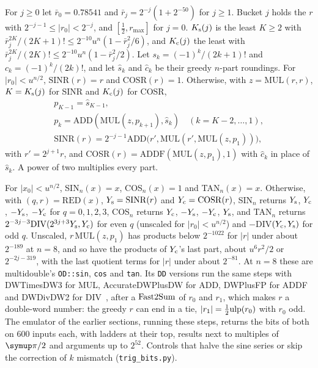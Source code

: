 For $j \ge 0$ let $\bar r_0 = 0.78541$ and $\bar r_j = 2^{-j}(1 + 2^{-50})$ for $j \ge 1$. Bucket $j$ holds
the $r$ with $2^{-j-1} \le |r_0| < 2^{-j}$, and $[\frac12, r_{\max}]$ for $j = 0$. $K_{\rm s}(j)$ is the least $K \ge 2$
with $\bar r_j^{2K}/(2K+1)! \le 2^{-10}u^n(1 - \bar r_j^2/6)$, and $K_{\rm c}(j)$ the least with $\bar r_j^{2K}/(2K)! \le
2^{-10}u^n(1 - \bar r_j^2/2)$. Let $s_k = (-1)^k/(2k+1)!$ and $c_k = (-1)^k/(2k)!$, and let $\hat s_k$ and $\hat c_k$ be
their greedy $n$-part roundings. For $|r_0| < u^{n/2}$, $\textrm{SINR}(r) = r$ and $\textrm{COSR}(r) = 1$. Otherwise,
with $z = \mathrm{MUL}(r, r)$, $K = K_{\rm s}(j)$ for SINR and $K_{\rm c}(j)$ for COSR,
\begin{gather*}
p_{K-1} = \hat s_{K-1}, \\
p_k = \mathrm{ADD}(\mathrm{MUL}(z, p_{k+1}), \hat s_k) \quad (k = K-2, \dots, 1), \\
\textrm{SINR}(r) = 2^{-j-1}\mathrm{ADD}\bigl(r', \mathrm{MUL}(r', \mathrm{MUL}(z, p_1))\bigr),
\end{gather*}
with $r' = 2^{j+1}r$, and COSR$(r) = \mathrm{ADDF}(\mathrm{MUL}(z,
p_1), 1)$ with $\hat c_k$ in place of $\hat s_k$. A power of two multiplies every part.

 For $|x_0| < u^{n/2}$, SIN$_n(x) = x$, COS$_n(x) = 1$ and TAN$_n(x) = x$. Otherwise, with $(q, r)
= \mathrm{RED}(x)$, $Y_{\rm s} = \mathrm{SINR}(r)$ and $Y_{\rm c} = \mathrm{COSR}(r)$, SIN$_n$ returns $Y_{\rm s}$,
$Y_{\rm c}$, $-Y_{\rm s}$, $-Y_{\rm c}$ for $q = 0, 1, 2, 3$, COS$_n$ returns $Y_{\rm c}$, $-Y_{\rm s}$, $-Y_{\rm c}$,
$Y_{\rm s}$, and TAN$_n$ returns $2^{-3j-3}\mathrm{DIV}(2^{3j+3}Y_{\rm s}, Y_{\rm c})$ for even $q$ (unscaled for
$|r_0| < u^{n/2}$) and $-$DIV$(Y_{\rm c}, Y_{\rm s})$ for odd $q$. Unscaled, $r\,\mathrm{MUL}(z, p_1)$ has products below
$2^{-1022}$ for $|r|$ under about $2^{-189}$ at $n = 8$, and so have the products of $Y_{\rm c}$'s last part, about $u^6r^2/2$
or $2^{-2j-319}$, with the last quotient terms for $|r|$ under about $2^{-81}$. At $n = 8$ these are multidouble's
\texttt{OD::sin}, \texttt{cos} and \texttt{tan}. Its \texttt{DD} versions run the same steps with DWTimesDW3 for MUL,
AccurateDWPlusDW for ADD, DWPlusFP for ADDF and DWDivDW2 for DIV~\cite{JMP17}, after a $\mathrm{Fast2Sum}$ of $r_0$ and $r_1$,
which makes $r$ a double-word number: the greedy $r$ can end in a tie, $|r_1| = \frac12\mathrm{ulp}(r_0)$ with $r_0$ odd.
The emulator of the earlier sections, running these steps, returns the bits of both on 600 inputs each, with ladders
at their top, results next to multiples of $\cpi/2$ and arguments up to $2^{52}$. Controls that halve the sine series or
skip the correction of $k$ mismatch (\texttt{trig\_bits.py}).

